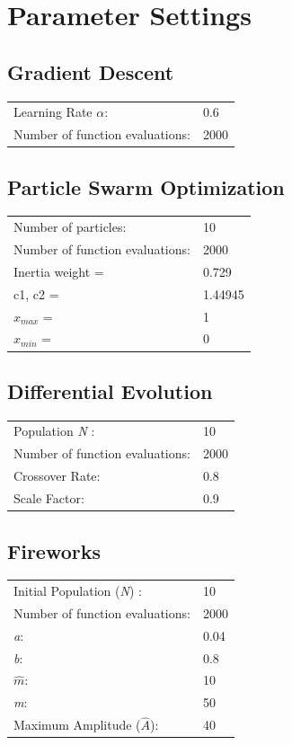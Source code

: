 \documentclass[11pt, a4paper]{report}
\begin{document}
\section{Parameter Settings}
\subsection{Gradient Descent}
\begin{tabular}{l l}
	Learning Rate $ \alpha $: & 0.6 \\
	Number of function evaluations: & 2000 \\ 
\end{tabular}

\subsection{Particle Swarm Optimization}
\begin{tabular}{l l}
	Number of particles: & 10 \\
	Number of function evaluations: & 2000 \\ 
	Inertia weight = & 0.729 \\
	c1, c2 = & 1.44945 \\
	$ x_{max} $ = & 1 \\
	$ x_{min} $ = & 0 \\
\end{tabular}

\subsection{Differential Evolution}
\begin{tabular}{l l}
	Population \textit{N} : & 10\\
	Number of function evaluations: & 2000 \\ 
	Crossover Rate: & 0.8 \\
	Scale Factor: & 0.9 \\
\end{tabular}

\subsection{Fireworks}
\begin{tabular}{l l}
	Initial Population (\textit{N}) : & 10\\
	Number of function evaluations: & 2000 \\ 
	\textit{a}: & 0.04 \\
	\textit{b}: & 0.8 \\
	$ \hat{m} $: & 10 \\
	\textit{m}: & 50 \\
	Maximum Amplitude ($ \hat{A} $): & 40 \\
\end{tabular}
\end{document}
